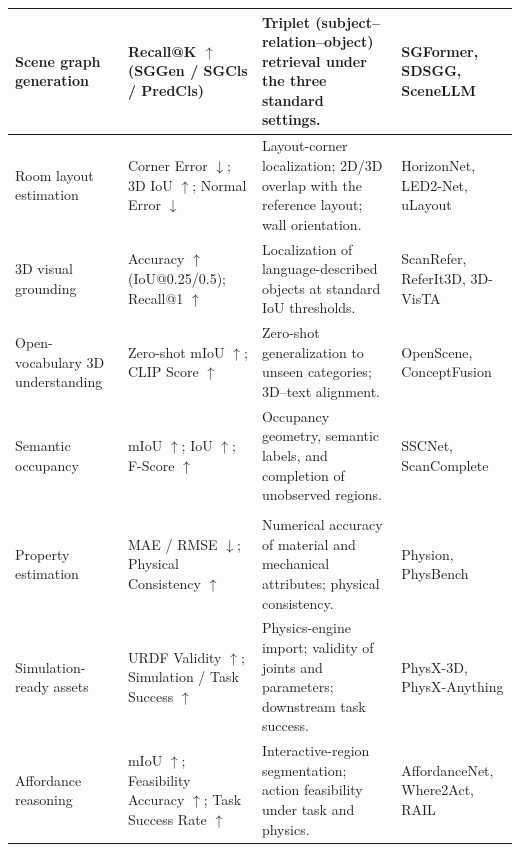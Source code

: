 \documentclass{SCIS2026}
\begin{document}
\begin{table}[!t]
{\begin{tabular}{@{} >{\RaggedRight\arraybackslash}m{2.4cm} >{\RaggedRight\arraybackslash}m{4.6cm} >{\RaggedRight\arraybackslash}m{8.2cm} >{\RaggedRight\arraybackslash}m{3.2cm} @{}}
        \cmidrule[0.25pt](lr){1-4}
        Scene graph generation & Recall@K $\uparrow$ (SGGen / SGCls / PredCls) & Triplet (subject--relation--object) retrieval under the three standard settings. & SGFormer, SDSGG, SceneLLM \\

        \cmidrule[0.25pt](lr){1-4}
        Room layout estimation & Corner Error $\downarrow$; 3D IoU $\uparrow$; Normal Error $\downarrow$ & Layout-corner localization; 2D/3D overlap with the reference layout; wall orientation. & HorizonNet, LED2-Net, uLayout \\

        \cmidrule[0.25pt](lr){1-4}
        3D visual grounding & Accuracy $\uparrow$ (IoU@0.25/0.5); Recall@1 $\uparrow$ & Localization of language-described objects at standard IoU thresholds. & ScanRefer, ReferIt3D, 3D-VisTA \\

        \cmidrule[0.25pt](lr){1-4}
        Open-vocabulary 3D understanding & Zero-shot mIoU $\uparrow$; CLIP Score $\uparrow$ & Zero-shot generalization to unseen categories; 3D--text alignment. & OpenScene, ConceptFusion \\

        \cmidrule[0.25pt](lr){1-4}
        Semantic occupancy & mIoU $\uparrow$; IoU $\uparrow$; F-Score $\uparrow$ & Occupancy geometry, semantic labels, and completion of unobserved regions. & SSCNet, ScanComplete \\

        \arrayrulecolor{TableNavy}
        \cmidrule[0.50pt]{1-4}

        \rowcolor{TableSub}
        \multicolumn{4}{@{}l}{\hspace{0.12em}\textcolor{TableNavy}{\bfseries III.\;Physical and functional understanding}}\\[0.6em]
        \arrayrulecolor{GrayRule}

        Property estimation & MAE / RMSE $\downarrow$; Physical Consistency $\uparrow$ & Numerical accuracy of material and mechanical attributes; physical consistency. & Physion, PhysBench \\

        \cmidrule[0.25pt](lr){1-4}
        Simulation-ready assets & URDF Validity $\uparrow$; Simulation / Task Success $\uparrow$ & Physics-engine import; validity of joints and parameters; downstream task success. & PhysX-3D, PhysX-Anything \\

        \cmidrule[0.25pt](lr){1-4}
        Affordance reasoning & mIoU $\uparrow$; Feasibility Accuracy $\uparrow$; Task Success Rate $\uparrow$ & Interactive-region segmentation; action feasibility under task and physics. & AffordanceNet, Where2Act, RAIL \\


\end{tabular}}
\end{table}
\end{document}
